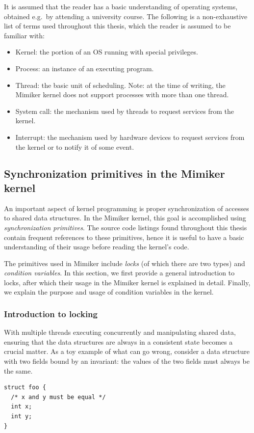 \documentclass[shortabstract, manyadvisors, english, mgr]{iithesis}
\begin{document}
It is assumed that the reader has a basic understanding of operating systems,
obtained e.g.\ by attending a university course. The following is a
non-exhaustive list of terms used throughout this thesis, which the reader is
assumed to be familiar with:
\begin{itemize}
  \item Kernel: the portion of an OS running with special privileges.
  \item Process: an instance of an executing program.
  \item Thread: the basic unit of scheduling. Note: at the time of writing, the
    Mimiker kernel does not support processes with more than one thread.
  \item System call: the mechanism used by threads to request services from the
    kernel.
  \item Interrupt: the mechanism used by hardware devices to request services
    from the kernel or to notify it of some event.
\end{itemize}

\subsection{Synchronization primitives in the Mimiker
  kernel}\label{chap:locking-intro}

An important aspect of kernel programming is proper synchronization of accesses
to shared data structures. In the Mimiker kernel, this goal is accomplished
using \textit{synchronization primitives}. The source code listings found
throughout this thesis contain frequent references to these primitives, hence it
is useful to have a basic understanding of their usage before reading the kernel's
code.

The primitives used in Mimiker include \textit{locks} (of which there are two
types) and \textit{condition variables}. In this section, we first provide a
general introduction to locks, after which their usage in the Mimiker kernel is
explained in detail. Finally, we explain the purpose and usage of condition
variables in the kernel.

\subsubsection*{Introduction to locking}

With multiple threads executing concurrently and manipulating shared data,
ensuring that the data structures are always in a consistent state becomes a
crucial matter. As a toy example of what can go wrong, consider a data structure
with two fields bound by an invariant: the values of the two fields must always
be the same.
\begin{listing}[H]
\begin{verbatim}
struct foo {
  /* x and y must be equal */
  int x;
  int y; 
}
\end{verbatim}
\end{listing}
\end{document}
